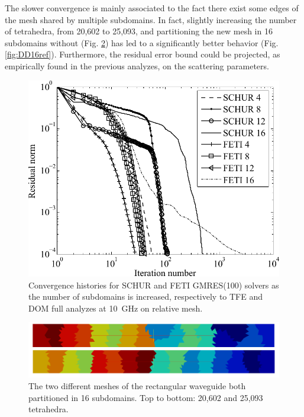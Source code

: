 The slower convergence is mainly associated to the fact there exist some edges of the mesh shared by multiple subdomains. In fact, slightly increasing the number of tetrahedra, from 20,602 to 25,093, and partitioning the new mesh in 16 subdomains without  (Fig. \ref{fig:Partitions2}) has led to a significantly better behavior (Fig. \ref{fig:DD16ref}). Furthermore, the residual error bound could be projected, as empirically found in the previous analyzes, on the scattering parameters.

\begin{figure}[h!]
\centering
\includegraphics[width=13.4cm]{DDsweep}
\caption{Convergence histories for SCHUR and FETI GMRES(100) solvers as the number of subdomains is increased, respectively to TFE and DOM full analyzes at 10~GHz on relative mesh.}
\label{fig:DDsweep}
\end{figure}

\begin{figure}[h!]
\centering
\includegraphics[width=\textwidth]{Partitions2}
\caption{The two different meshes of the rectangular waveguide both partitioned in 16 subdomains. Top to bottom: 20,602 and 25,093 tetrahedra.}
\label{fig:Partitions2}
\end{figure}

